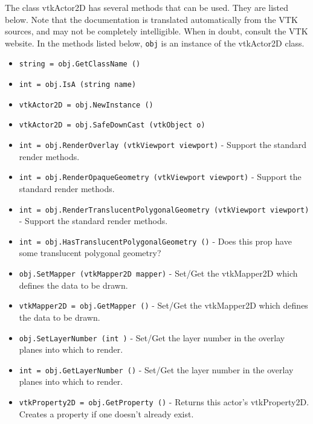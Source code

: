 The class vtkActor2D has several methods that can be used.
  They are listed below.
Note that the documentation is translated automatically from the VTK sources,
and may not be completely intelligible.  When in doubt, consult the VTK website.
In the methods listed below, \verb|obj| is an instance of the vtkActor2D class.
\begin{itemize}
\item  \verb|string = obj.GetClassName ()|

\item  \verb|int = obj.IsA (string name)|

\item  \verb|vtkActor2D = obj.NewInstance ()|

\item  \verb|vtkActor2D = obj.SafeDownCast (vtkObject o)|

\item  \verb|int = obj.RenderOverlay (vtkViewport viewport)| -  Support the standard render methods.

\item  \verb|int = obj.RenderOpaqueGeometry (vtkViewport viewport)| -  Support the standard render methods.

\item  \verb|int = obj.RenderTranslucentPolygonalGeometry (vtkViewport viewport)| -  Support the standard render methods.

\item  \verb|int = obj.HasTranslucentPolygonalGeometry ()| -  Does this prop have some translucent polygonal geometry?

\item  \verb|obj.SetMapper (vtkMapper2D mapper)| -  Set/Get the vtkMapper2D which defines the data to be drawn.

\item  \verb|vtkMapper2D = obj.GetMapper ()| -  Set/Get the vtkMapper2D which defines the data to be drawn.

\item  \verb|obj.SetLayerNumber (int )| -  Set/Get the layer number in the overlay planes into which to render.

\item  \verb|int = obj.GetLayerNumber ()| -  Set/Get the layer number in the overlay planes into which to render.

\item  \verb|vtkProperty2D = obj.GetProperty ()| -  Returns this actor's vtkProperty2D.  Creates a property if one
 doesn't already exist.


\end{itemize}
